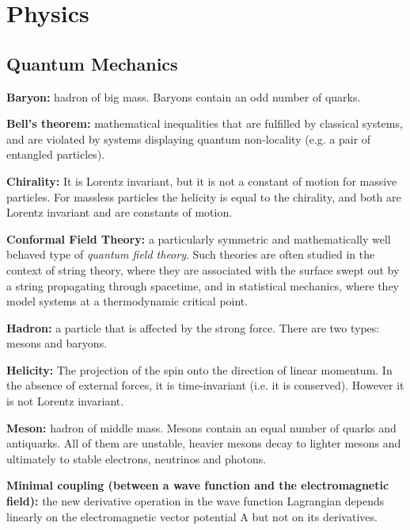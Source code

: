 \chapter{Physics}

\section{Quantum Mechanics}

\begin{list}{}{}
	\item \textbf{Baryon:} hadron of big mass. Baryons contain an odd number of quarks.
	
	\item \textbf{Bell's theorem:} mathematical inequalities that are fulfilled by classical systems, and are violated by systems displaying quantum non-locality (e.g. a pair of entangled particles).
	
	\item \textbf{Chirality:} It is Lorentz invariant, but it is not a constant of motion for massive particles. For massless particles the helicity is equal to the chirality, and both are Lorentz invariant and are constants of motion.
	
	\item \textbf{Conformal Field Theory:} a particularly symmetric and mathematically well behaved type of  \emph{quantum field theory}. Such theories are often studied in the context of string theory, where they are associated with the surface swept out by a string propagating through spacetime, and in statistical mechanics, where they model systems at a thermodynamic critical point.
	
	\item \textbf{Hadron:} a particle that is affected by the strong force. There are two types: mesons and baryons.
	
	\item \textbf{Helicity:} The projection of the spin onto the direction of linear momentum. In the absence of external forces, it is time-invariant (i.e. it is conserved). However it is not Lorentz invariant.
	
	\item \textbf{Meson:} hadron of middle mass. Mesons contain an equal number of quarks and antiquarks. All of them are unstable, heavier mesons decay to lighter mesons and ultimately to stable electrons, neutrinos and photons.
	
	\item \textbf{Minimal coupling (between a wave function and the electromagnetic field):} the new derivative operation in the wave function Lagrangian depends linearly on the electromagnetic vector potential A but not on its derivatives.
	

\end{list}
